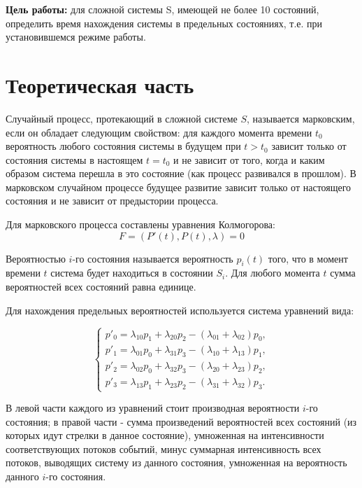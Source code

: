 \documentclass[a4paper, 14pt]{article}
\begin{document}
	\textbf{Цель работы:} для сложной системы S, имеющей не более 10 состояний, определить  время нахождения системы в предельных состояниях, т.е. при установившемся режиме работы. 
	
	
	\section*{Теоретическая часть}
	
Случайный процесс, протекающий в сложной системе $S$, называется марковским, если он обладает следующим свойством:  для каждого момента времени $t_0$ вероятность любого состояния системы в будущем при $t > t_0$ зависит только от состояния системы в настоящем $t = t_0$ и не зависит от того, когда и каким образом система перешла в это состояние (как процесс развивался в прошлом). В марковском случайном процессе будущее развитие зависит только от настоящего состояния и не зависит от предыстории процесса.

Для марковского процесса составлены уравнения Колмогорова:
$$F=(P'(t), P(t), \lambda)=0$$


Вероятностью $i$-го состояния называется вероятность $p_i(t)$ того, что в момент времени $t$ система будет находиться в состоянии $S_i$. Для любого момента $t$ сумма вероятностей всех состояний равна единице. 

Для нахождения предельных вероятностей используется система уравнений вида:

\begin{equation*}
 \begin{cases}
   p'_0 = \lambda_{10}p_1 + \lambda_{20}p_2 - (\lambda_{01} + \lambda_{02})p_0,
   \\
  p'_1 = \lambda_{01}p_0 + \lambda_{31}p_3 - (\lambda_{10} + \lambda_{13})p_1,
   \\
  p'_2 = \lambda_{02}p_0 + \lambda_{32}p_3 - (\lambda_{20} + \lambda_{23})p_2,
  \\
  p'_3 = \lambda_{13}p_1 + \lambda_{23}p_2 - (\lambda_{31} + \lambda_{32})p_3.
 \end{cases}
\end{equation*}

В левой части каждого из уравнений стоит производная вероятности $i$-го состояния; в правой части - сумма произведений вероятностей всех состояний (из которых идут стрелки в данное состояние), умноженная на интенсивности соответствующих потоков событий, минус суммарная интенсивность всех потоков, выводящих систему из данного состояния, умноженная на вероятность данного $i$-го состояния.
\end{document}
